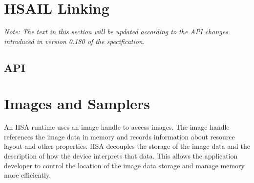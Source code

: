 \documentclass[final]{book}
\newcommand{\reffld}[1]{\textit{#1}}
\begin{document}






% 

\section{HSAIL Linking}\label{linking}
\emph{Note: The text in this section will be updated according to the API
  changes introduced in version 0.180 of the specification.}
\subsection{API}



\section{Images and Samplers}\label{images}

An HSA runtime uses an image handle  to access
images. The image handle references the image data in memory and records
information about resource layout and other properties. HSA decouples the
storage of the image data and the description of how the device interprets that
data. This allows the application developer to control the location of the
image data storage and manage memory more efficiently.
\end{document}
